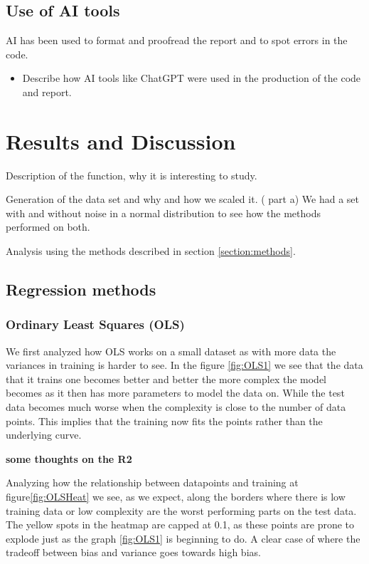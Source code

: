 \documentclass[amssymb,twocolumn,aps]{revtex4}
\begin{document}
\subsection{Use of AI tools}
	AI has been used to format and proofread the report and to spot errors in the code.
\begin{itemize}
    \item Describe how AI tools like ChatGPT were used in the production of the code and report.
\end{itemize}

\newpage



\section{Results and Discussion}\label{section:results}

Description of the function, why it is interesting to study.



Generation of the data set and why and how we scaled it. ( part a)
We had a set with and without noise in a normal distribution to see how the methods performed on both.


Analysis using the methods described in section \ref{section:methods}.

\subsection{Regression methods}

\subsubsection{Ordinary Least Squares (OLS)}

We first analyzed how OLS works on a small dataset as with more data the variances in training is harder to see. In the figure \ref{fig:OLS1} we see that the data that it trains one becomes better and better the more complex the model becomes as it then has more parameters to model the data on. While the test data becomes much worse when the complexity is close to the number of data points. This implies that the training now fits the points rather than the underlying curve.

\textbf{some thoughts on the R2}


Analyzing how the relationship between datapoints and training at figure\ref{fig:OLSHeat} we see, as we expect, along the borders where there is low training data or low complexity are the worst performing parts on the test data. The yellow spots in the heatmap are capped at 0.1, as these points are prone to explode just as the graph \ref{fig:OLS1} is beginning to do.
A clear case of where the tradeoff between bias and variance goes towards high bias.
\end{document}
